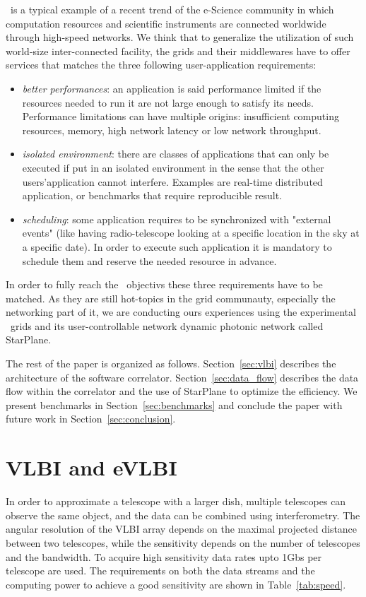 \scarie\ is a typical example of a recent trend of the e-Science 
community in which computation resources and scientific instruments 
are connected worldwide through high-speed networks. We think that to 
generalize the utilization of such world-size inter-connected facility, 
the grids and their middlewares have to offer services that matches the three
following user-application requirements:
\begin{itemize}
\item \emph{better performances}: an application is said performance
  limited if the resources needed to run it are not large enough to
  satisfy its needs. Performance limitations can have multiple
  origins: insufficient computing resources, memory, high network
  latency or low network throughput.
  
\item \emph{isolated environment}: there are classes of applications
  that can only be executed if put in an isolated environment in the 
  sense that the other users'application cannot interfere. Examples are 
  real-time distributed application, or benchmarks that require reproducible
  result.

\item \emph{scheduling}: some application requires to be synchronized
  with "external events" (like having radio-telescope looking at a
  specific location in the sky at a specific date). In order to
  execute such application it is mandatory to schedule them and
  reserve the needed resource in advance.
\end{itemize}

In order to fully reach the \scarie\ objectivs these three requirements 
have to be matched. As they are still hot-topics in the grid 
communauty, especially the networking part of it, we are 
conducting ours experiences using the experimental
 \ grids and its user-controllable network dynamic 
photonic network called StarPlane. 

The rest of the paper is organized as follows. Section~\ref{sec:vlbi}
describes the architecture of the software correlator.
Section~\ref{sec:data_flow} describes the data flow within the
correlator and the use of StarPlane to optimize the efficiency. We
present benchmarks in Section~\ref{sec:benchmarks} and conclude the
paper with future work in Section~\ref{sec:conclusion}.


\section{VLBI and eVLBI}
In order to approximate a telescope with a larger dish, multiple
telescopes can observe the same object, and the data can be combined
using interferometry. The angular resolution of the VLBI array depends
on the maximal projected distance between two telescopes, while the
sensitivity depends on the number of telescopes and the bandwidth. To
acquire high sensitivity data rates upto 1Gbs per telescope are used.
The requirements on both the data streams and the computing power to
achieve a good sensitivity are shown in Table~\ref{tab:speed}.

